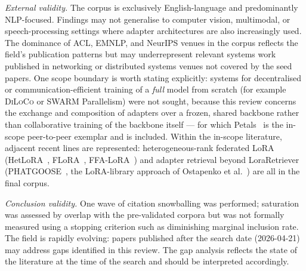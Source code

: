 \textit{External validity.}
The corpus is exclusively English-language and predominantly NLP-focused. Findings may not generalise to computer vision, multimodal, or speech-processing settings where adapter architectures are also increasingly used. The dominance of ACL, EMNLP, and NeurIPS venues in the corpus reflects the field's publication patterns but may underrepresent relevant systems work published in networking or distributed systems venues not covered by the seed papers.
One scope boundary is worth stating explicitly: systems for decentralised or
communication-efficient training of a \emph{full} model from scratch (for
example \textsc{DiLoCo} or \textsc{SWARM} Parallelism) were not sought, because
this review concerns the exchange and composition of adapters over a frozen,
shared backbone rather than collaborative training of the backbone itself ---
for which Petals~\cite{Borzunov2023} is the in-scope peer-to-peer exemplar and
is included. Within the in-scope literature, adjacent recent lines are
represented: heterogeneous-rank federated LoRA
(HetLoRA~\cite{ChoHeteroLoRA2024}, FLoRA~\cite{WangFLoRA2024},
FFA-LoRA~\cite{SunImprovingLoRA2024}) and adapter retrieval beyond
LoraRetriever~\cite{ZhaoLoraRetriever2024}
(PHATGOOSE~\cite{Muqeeth2024}, the LoRA-library approach of Ostapenko et
al.~\cite{Ostapenko2024}) are all in the final corpus.

\textit{Conclusion validity.}
One wave of citation snowballing was performed; saturation was assessed by overlap with the pre-validated corpora but was not formally measured using a stopping criterion such as diminishing marginal inclusion rate. The field is rapidly evolving: papers published after the search date (2026-04-21) may address gaps identified in this review. The gap analysis reflects the state of the literature at the time of the search and should be interpreted accordingly.

